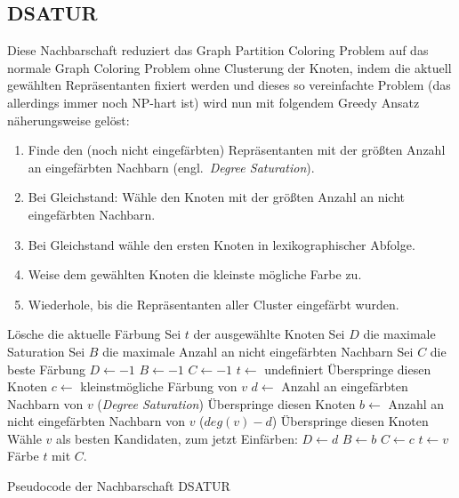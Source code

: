 \subsection{DSATUR}
\label{sec:dsatur}
Diese Nachbarschaft reduziert das Graph Partition Coloring Problem auf das normale Graph Coloring Problem ohne Clusterung der Knoten, indem die aktuell gewählten Repräsentanten fixiert werden und dieses so vereinfachte Problem (das allerdings immer noch NP-hart ist) wird nun mit folgendem Greedy Ansatz näherungsweise gelöst:

\begin{enumerate}
    \item Finde den (noch nicht eingefärbten) Repräsentanten mit der größten Anzahl an eingefärbten Nachbarn (engl.\ \textit{Degree Saturation}).
    \item Bei Gleichstand: Wähle den Knoten mit der größten Anzahl an nicht eingefärbten Nachbarn.
    \item Bei Gleichstand wähle den ersten Knoten in lexikographischer Abfolge.
    \item Weise dem gewählten Knoten die kleinste mögliche Farbe zu.
    \item Wiederhole, bis die Repräsentanten aller Cluster eingefärbt wurden.
\end{enumerate}

\begin{algorithm}
\begin{algorithmic}[1]
\State Lösche die aktuelle Färbung
\State Sei $t$ der ausgewählte Knoten
\State Sei $D$ die maximale Saturation
\State Sei $B$ die maximale Anzahl an nicht eingefärbten Nachbarn
\State Sei $C$ die beste Färbung
\State $D \leftarrow -1$
\State $B \leftarrow -1$
\State $C \leftarrow -1$
\State $t \leftarrow $ undefiniert
\State Überspringe diesen Knoten
\Else
\State $c\leftarrow$ kleinstmögliche Färbung von $v$
\State $d\leftarrow$ Anzahl an eingefärbten Nachbarn von $v$ (\textit{Degree Saturation})
\State Überspringe diesen Knoten
\EndIf
\State $b\leftarrow$ Anzahl an nicht eingefärbten Nachbarn von $v$ ($deg(v) - d$)
\State Überspringe diesen Knoten
\EndIf
\State Wähle $v$ als besten Kandidaten, zum jetzt Einfärben:
\State $D \leftarrow d$
\State $B \leftarrow b$
\State $C \leftarrow c$
\State $t \leftarrow v$
\EndIf
\EndFor
\State Färbe $t$ mit $C$.
\EndFor
\end{algorithmic}
\caption{Pseudocode der Nachbarschaft DSATUR}
\end{algorithm}

